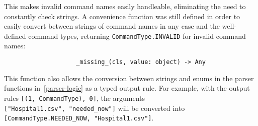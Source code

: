 \documentclass{article}
\begin{document}
				This makes invalid command names easily handleable, eliminating the need to constantly
				check strings. A convenience function was still defined in order to easily convert
				between strings of command names in any case and the well-defined command types, returning
				\verb|CommandType.INVALID| for invalid command names:

				\begin{verbatim}
					_missing_(cls, value: object) -> Any
				\end{verbatim}

				This function also allows the conversion between strings and enums in the parser functions
				in~\ref{parser-logic} as a typed output rule. For example, with the output rules
				\verb|[(1, CommandType), 0]|, the arguments \\
				\verb|["Hospital1.csv", "needed_now"]| will be converted into \\
				\verb|[CommandType.NEEDED_NOW, "Hospital1.csv"]|.
\end{document}
